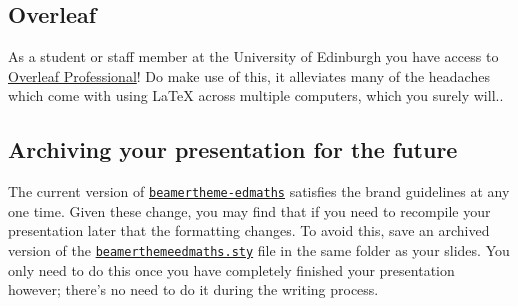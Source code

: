 \documentclass[12pt]{article}
\newcommand\pkg[1]{\href{https://www.ctan.org/pkg/#1}{\color{teal}\lstinline{#1}}}
\begin{document}
\subsection{Overleaf}

As a student or staff member at the University of Edinburgh you have access to \href{https://www.ed.ac.uk/information-services/computing/desktop-personal/software/main-software-deals/other-software/overleaf}{Overleaf Professional}! Do make use of this, it alleviates many of the headaches which come with using \LaTeX{} across multiple computers, which you surely will..

\subsection{Archiving your presentation for the future}

The current version of \pkg{beamertheme-edmaths} satisfies the brand guidelines at any one time. Given these change, you may find that if you need to recompile your presentation later that the formatting changes. To avoid this, save an archived version of the \href{https://github.com/Foggalong/edinburgh-math-latex/blob/main/beamerthemeedmaths.sty}{\lstinline|beamerthemeedmaths.sty|} file in the same folder as your slides. You only need to do this once you have completely finished your presentation however; there's no need to do it during the writing process.
\end{document}
